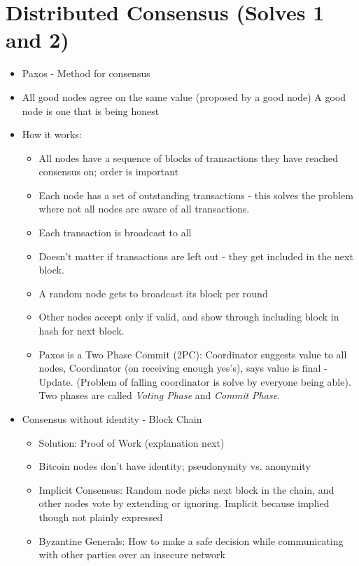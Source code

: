 \documentclass{article}
\begin{document}
\section*{Distributed Consensus (Solves 1 and 2)}
\begin{itemize}
  \item Paxos - Method for consensus
  \item All good nodes agree on the same value (proposed by a good node)
    \subitem A good node is one that is being honest
  \item How it works:
    \begin{itemize}
      \item All nodes have a sequence of blocks of transactions they have reached consensus on; order is important
      \item Each node has a set of outstanding transactions - this solves the problem where not all nodes are aware of all transactions.
      \item Each transaction is broadcast to all
      \item Doesn't matter if transactions are left out - they get included in the next block.
      \item A random node gets to broadcast its block per round
      \item Other nodes accept only if valid, and show through including block in hash for next block.
      \item Paxos is a Two Phase Commit (2PC): Coordinator suggests value to all nodes, Coordinator (on receiving enough
          yes's), says value is final - Update. (Problem of falling coordinator is solve by everyone being able).\\
        \subitem Two phases are called \emph{Voting Phase} and \emph{Commit Phase}.
    \end{itemize}
  \item Consensus without identity - Block Chain
    \begin{itemize}
      \item Solution: Proof of Work (explanation next)
      \item Bitcoin nodes don't have identity; pseudonymity vs. anonymity
      \item Implicit Consensus: Random node picks next block in the chain, and other nodes vote by extending or ignoring.
        \subitem Implicit because implied though not plainly expressed
      \item Byzantine Generals: How to make a safe decision while communicating with other parties over an insecure network

\end{itemize}
\end{itemize}
\end{document}
